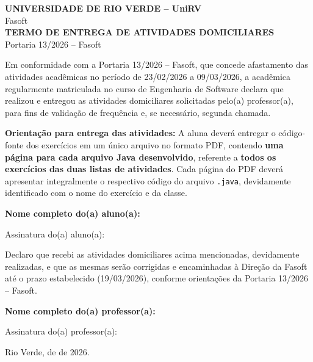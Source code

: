 \documentclass[12pt,a4paper]{article}
\begin{document}
\begin{center}
    \textbf{UNIVERSIDADE DE RIO VERDE – UniRV} \\
    Fasoft \\
    \vspace{0.5cm}
    \textbf{TERMO DE ENTREGA DE ATIVIDADES DOMICILIARES} \\
    Portaria 13/2026 – Fasoft
\end{center}

\vspace{1cm}

Em conformidade com a Portaria 13/2026 – Fasoft, que concede afastamento das atividades acadêmicas no período de 23/02/2026 a 09/03/2026, a acadêmica regularmente matriculada no curso de Engenharia de Software declara que realizou e entregou as atividades domiciliares solicitadas pelo(a) professor(a), para fins de validação de frequência e, se necessário, segunda chamada.

\vspace{0.7cm}

\textbf{Orientação para entrega das atividades:}  
A aluna deverá entregar o código-fonte dos exercícios em um único arquivo no formato PDF, contendo \textbf{uma página para cada arquivo Java desenvolvido}, referente a \textbf{todos os exercícios das duas listas de atividades}. Cada página do PDF deverá apresentar integralmente o respectivo código do arquivo \texttt{.java}, devidamente identificado com o nome do exercício e da classe.

\vspace{1cm}

\noindent\textbf{Nome completo do(a) aluno(a):} \underline{\hspace{10cm}}

\vspace{2cm}

\noindent Assinatura do(a) aluno(a): \underline{\hspace{8cm}}

\vspace{2cm}

Declaro que recebi as atividades domiciliares acima mencionadas, devidamente realizadas, e que as mesmas serão corrigidas e encaminhadas à Direção da Fasoft até o prazo estabelecido (19/03/2026), conforme orientações da Portaria 13/2026 – Fasoft.

\vspace{1cm}

\noindent\textbf{Nome completo do(a) professor(a):} \underline{\hspace{10cm}}

\vspace{2cm}

\noindent Assinatura do(a) professor(a): \underline{\hspace{8cm}}

\vfill

\noindent Rio Verde, \underline{\hspace{3cm}} de \underline{\hspace{3cm}} de 2026.
\end{document}
